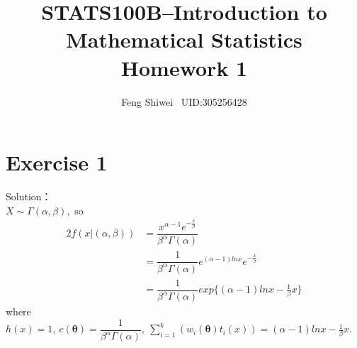 \documentclass[a4papers]{ctexart}
\title{STATS100B--Introduction to Mathematical Statistics \\Homework 1}
\author{Feng Shiwei \ UID:305256428}
\date{}
\begin{document}
\maketitle
\section*{Exercise 1}
\noindent Solution：\\
\indent 
$X\sim \Gamma(\alpha,\beta),$ so
\begin{alignat*}{2}
    f(x|(\alpha,\beta))&=\dfrac{x^{\alpha-1}e^{-\frac{x}{\beta}}}{\beta^\alpha\Gamma(\alpha)}\\
    &= \dfrac{1}{\beta^\alpha\Gamma(\alpha)}e^{(\alpha-1)lnx}e^{-\frac{x}{\beta}}\\
    &= \dfrac{1}{\beta^\alpha\Gamma(\alpha)}exp\{(\alpha-1)lnx-\frac{1}{\beta}x\}
\end{alignat*}
where $h(x)=1,\ c(\boldsymbol{\theta})=\dfrac{1}{\beta^\alpha\Gamma(\alpha)},\ 
\sum_{i=1}^{k}\left(w_i(\boldsymbol{\theta})t_i(x) \right)=(\alpha-1)lnx-\frac{1}{\beta}x.$
\end{document}
